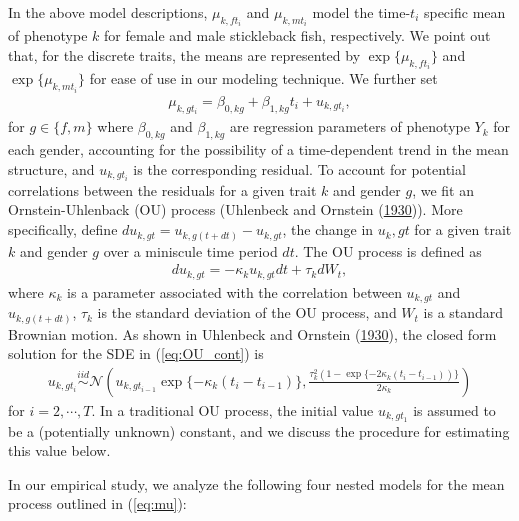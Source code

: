 \documentclass[
  12pt,
]{article}
\begin{document}
In the above model descriptions, \(\mu_{k,ft_i}\) and \(\mu_{k,mt_i}\)
model the time-\(t_i\) specific mean of phenotype \(k\) for female and
male stickleback fish, respectively. We point out that, for the discrete
traits, the means are represented by \(\exp\{\mu_{k,ft_i}\}\) and
\(\exp\{\mu_{k,mt_i}\}\) for ease of use in our modeling technique. We
further set \begin{align}
\mu_{k,gt_i} = \beta_{0,kg} + \beta_{1,kg}t_i + u_{k,gt_i},
\label{eq:mu}
\end{align} for \(g \in \{f,m\}\) where \(\beta_{0,kg}\) and
\(\beta_{1,kg}\) are regression parameters of phenotype \(Y_k\) for each
gender, accounting for the possibility of a time-dependent trend in the
mean structure, and \(u_{k,gt_i}\) is the corresponding residual. To
account for potential correlations between the residuals for a given
trait \(k\) and gender \(g\), we fit an Ornstein-Uhlenback (OU) process
(Uhlenbeck and Ornstein (\protect\hyperlink{ref-OUProcess}{1930})). More
specifically, define \(du_{k,gt} = u_{k,g(t + dt)} - u_{k,gt}\), the
change in \(u_k,gt\) for a given trait \(k\) and gender \(g\) over a
miniscule time period \(dt\). The OU process is defined as \begin{align}
du_{k,gt} = -\kappa_k u_{k,gt} dt + \tau_k dW_t,
\label{eq:OU_cont}
\end{align} where \(\kappa_k\) is a parameter associated with the
correlation between \(u_{k,gt}\) and \(u_{k,g(t+dt)}\), \(\tau_k\) is
the standard deviation of the OU process, and \(W_t\) is a standard
Brownian motion. As shown in Uhlenbeck and Ornstein
(\protect\hyperlink{ref-OUProcess}{1930}), the closed form solution for
the SDE in (\ref{eq:OU_cont}) is \begin{align}
u_{k,gt_i} \overset{iid}{\sim}\mathcal{N}\left(u_{k,gt_{i-1}}\exp\{-\kappa_k(t_{i} - t_{i-1})\} , \frac{\tau_k^2(1 - \exp\{-2\kappa_k(t_{i} - t_{i-1}))\}}{2\kappa_k}\right)
\label{eq:OU_sol}
\end{align} for \(i = 2,\cdots,T\). In a traditional OU process, the
initial value \(u_{k,gt_1}\) is assumed to be a (potentially unknown)
constant, and we discuss the procedure for estimating this value below.

In our empirical study, we analyze the following four nested models for
the mean process outlined in (\ref{eq:mu}):
\end{document}
